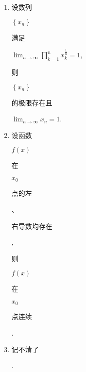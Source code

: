 \documentclass[10pt]{article}
\begin{document}
\begin{enumerate}
  \item \begin{CJK}{UTF8}{mj}设数列\end{CJK} $\left\{x_{n}\right\}$ \begin{CJK}{UTF8}{mj}满足\end{CJK} $\lim _{n \rightarrow \infty} \prod_{k=1}^{n} x_{k}^{\frac{1}{n}}=1$, \begin{CJK}{UTF8}{mj}则\end{CJK} $\left\{x_{n}\right\}$ \begin{CJK}{UTF8}{mj}的极限存在且\end{CJK} $\lim _{n \rightarrow \infty} x_{n}=1$.

  \item \begin{CJK}{UTF8}{mj}设函数\end{CJK} $f(x)$ \begin{CJK}{UTF8}{mj}在\end{CJK} $x_{0}$ \begin{CJK}{UTF8}{mj}点的左\end{CJK}、\begin{CJK}{UTF8}{mj}右导数均存在\end{CJK}, \begin{CJK}{UTF8}{mj}则\end{CJK} $f(x)$ \begin{CJK}{UTF8}{mj}在\end{CJK} $x_{0}$ \begin{CJK}{UTF8}{mj}点连续\end{CJK}.

  \item \begin{CJK}{UTF8}{mj}记不清了\end{CJK}.


\end{enumerate}
\end{document}
